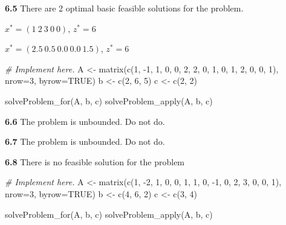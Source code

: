 \documentclass[
]{article}
\newenvironment{Shaded}{\begin{snugshade}}{\end{snugshade}}
\newcommand{\AttributeTok}[1]{\textcolor[rgb]{0.77,0.63,0.00}{#1}}
\newcommand{\CommentTok}[1]{\textcolor[rgb]{0.56,0.35,0.01}{\textit{#1}}}
\newcommand{\ConstantTok}[1]{\textcolor[rgb]{0.00,0.00,0.00}{#1}}
\newcommand{\DecValTok}[1]{\textcolor[rgb]{0.00,0.00,0.81}{#1}}
\newcommand{\FunctionTok}[1]{\textcolor[rgb]{0.00,0.00,0.00}{#1}}
\newcommand{\NormalTok}[1]{#1}
\newcommand{\OtherTok}[1]{\textcolor[rgb]{0.56,0.35,0.01}{#1}}
\newcommand{\SpecialCharTok}[1]{\textcolor[rgb]{0.00,0.00,0.00}{#1}}
\begin{document}
\textbf{6.5} There are 2 optimal basic feasible solutions for the
problem.

\(x^*= (1\ 2\ 3\ 0\ 0)\), \(z^*= 6\)

\(x^*= (2.5\ 0.5\ 0.0\ 0.0\ 1.5)\), \(z^*= 6\)

\begin{Shaded}
\begin{Highlighting}[]
\CommentTok{\# Implement here.}
\NormalTok{A }\OtherTok{\textless{}{-}} \FunctionTok{matrix}\NormalTok{(}\FunctionTok{c}\NormalTok{(}\DecValTok{1}\NormalTok{, }\SpecialCharTok{{-}}\DecValTok{1}\NormalTok{, }\DecValTok{1}\NormalTok{, }\DecValTok{0}\NormalTok{, }\DecValTok{0}\NormalTok{, }\DecValTok{2}\NormalTok{, }\DecValTok{2}\NormalTok{, }\DecValTok{0}\NormalTok{, }\DecValTok{1}\NormalTok{, }\DecValTok{0}\NormalTok{, }\DecValTok{1}\NormalTok{, }\DecValTok{2}\NormalTok{, }\DecValTok{0}\NormalTok{, }\DecValTok{0}\NormalTok{, }\DecValTok{1}\NormalTok{), }\AttributeTok{nrow=}\DecValTok{3}\NormalTok{, }\AttributeTok{byrow=}\ConstantTok{TRUE}\NormalTok{)}
\NormalTok{b }\OtherTok{\textless{}{-}} \FunctionTok{c}\NormalTok{(}\DecValTok{2}\NormalTok{, }\DecValTok{6}\NormalTok{, }\DecValTok{5}\NormalTok{)}
\NormalTok{c }\OtherTok{\textless{}{-}} \FunctionTok{c}\NormalTok{(}\DecValTok{2}\NormalTok{, }\DecValTok{2}\NormalTok{)}

\FunctionTok{solveProblem\_for}\NormalTok{(A, b, c)}
\FunctionTok{solveProblem\_apply}\NormalTok{(A, b, c)}
\end{Highlighting}
\end{Shaded}

\textbf{6.6} The problem is unbounded. Do not do.

\textbf{6.7} The problem is unbounded. Do not do.

\textbf{6.8} There is no feasible solution for the problem

\begin{Shaded}
\begin{Highlighting}[]
\CommentTok{\# Implement here.}
\NormalTok{A }\OtherTok{\textless{}{-}} \FunctionTok{matrix}\NormalTok{(}\FunctionTok{c}\NormalTok{(}\DecValTok{1}\NormalTok{, }\SpecialCharTok{{-}}\DecValTok{2}\NormalTok{, }\DecValTok{1}\NormalTok{, }\DecValTok{0}\NormalTok{, }\DecValTok{0}\NormalTok{, }\DecValTok{1}\NormalTok{, }\DecValTok{1}\NormalTok{, }\DecValTok{0}\NormalTok{, }\SpecialCharTok{{-}}\DecValTok{1}\NormalTok{, }\DecValTok{0}\NormalTok{, }\DecValTok{2}\NormalTok{, }\DecValTok{3}\NormalTok{, }\DecValTok{0}\NormalTok{, }\DecValTok{0}\NormalTok{, }\DecValTok{1}\NormalTok{), }\AttributeTok{nrow=}\DecValTok{3}\NormalTok{, }\AttributeTok{byrow=}\ConstantTok{TRUE}\NormalTok{)}
\NormalTok{b }\OtherTok{\textless{}{-}} \FunctionTok{c}\NormalTok{(}\DecValTok{4}\NormalTok{, }\DecValTok{6}\NormalTok{, }\DecValTok{2}\NormalTok{)}
\NormalTok{c }\OtherTok{\textless{}{-}} \FunctionTok{c}\NormalTok{(}\DecValTok{3}\NormalTok{, }\DecValTok{4}\NormalTok{)}

\FunctionTok{solveProblem\_for}\NormalTok{(A, b, c)}
\FunctionTok{solveProblem\_apply}\NormalTok{(A, b, c)}
\end{Highlighting}
\end{Shaded}
\end{document}
